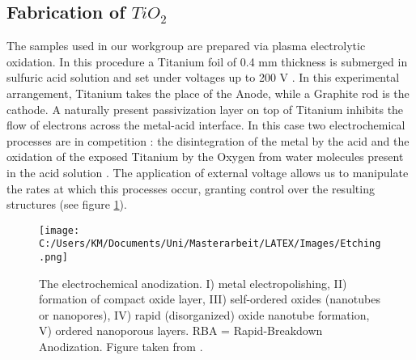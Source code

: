 \documentclass[12pt]{article}
\begin{document}
	
\subsection{Fabrication of $TiO_2$}
	\label{sec:Fabrication}
	The samples used in our workgroup are prepared via plasma electrolytic oxidation. In this procedure a Titanium foil of 0.4 mm thickness is submerged in sulfuric acid solution and set under voltages up to 200 V \cite{Titan1}. In this experimental arrangement, Titanium takes the place of the Anode, while a Graphite rod is the cathode. A naturally present passivization layer on top of Titanium inhibits the flow of electrons across the metal-acid interface. In this case two electrochemical processes are in competition : the disintegration of the metal by the acid and the oxidation of the exposed Titanium by the Oxygen from water  molecules  present in the acid solution \cite{Achhab, Etching}. The application of external voltage allows us to manipulate the rates at which this processes occur, granting control over the resulting structures (see figure \ref{fig:Etching}).
	
	\begin{figure}[p]
		\centering
			\texttt{[image: C:/Users/KM/Documents/Uni/Masterarbeit/LATEX/Images/Etching.png]}
		\caption{The electrochemical anodization.  I) metal electropolishing, II) formation of compact oxide layer, III) self-ordered oxides (nanotubes or nanopores), IV) rapid (disorganized) oxide nanotube formation, V) ordered nanoporous layers. RBA = Rapid-Breakdown Anodization. Figure taken from \cite{Etching}.}
		\label{fig:Etching}
	\end{figure}
	
\end{document}
